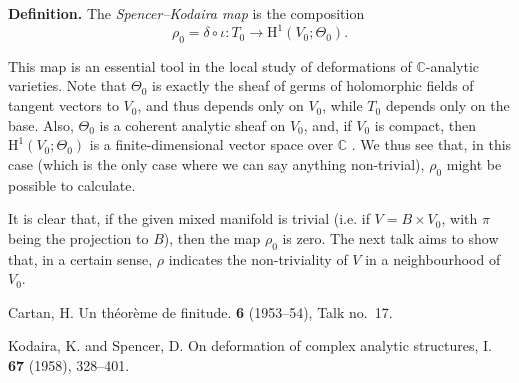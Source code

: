 \documentclass{article}
\newenvironment{rmenv}[1]
  {\par\medskip\noindent\textbf{#1.}\rmfamily}
  {\medskip}
\newcommand{\CC}{\mathbb{C}}
\newcommand{\HH}{\mathrm{H}}
\begin{document}
\begin{rmenv}{Definition}
  The \emph{Spencer--Kodaira map} is the composition
  \[
    \rho_0 = \delta\circ\iota\colon T_0 \to \HH^1(V_0;\Theta_0).
  \]
\end{rmenv}

This map is an essential tool in the local study of deformations of $\CC$-analytic varieties.
Note that $\Theta_0$ is exactly the sheaf of germs of holomorphic fields of tangent vectors to $V_0$, and thus depends only on $V_0$, while $T_0$ depends only on the base.
Also, $\Theta_0$ is a coherent analytic sheaf on $V_0$, and, if $V_0$ is compact, then $\HH^1(V_0;\Theta_0)$ is a finite-dimensional vector space over $\CC$ \cite{1}.
We thus see that, in this case (which is the only case where we can say anything non-trivial), $\rho_0$ might be possible to calculate.

It is clear that, if the given mixed manifold is trivial (i.e. if $V=B\times V_0$, with $\pi$ being the projection to $B$), then the map $\rho_0$ is zero.
The next talk aims to show that, in a certain sense, $\rho$ indicates the non-triviality of $V$ in a neighbourhood of $V_0$.






\nocite{*}

\begin{thebibliography}{2}

  {\sc Cartan, H.}
  \newblock Un th\'{e}or\`{e}me de finitude.
   \textbf{6} (1953--54), Talk no.~17.

  {\sc Kodaira, K. and Spencer, D.}
  \newblock On deformation of complex analytic structures, I.
   \textbf{67} (1958), 328--401.

\end{thebibliography}
\end{document}
